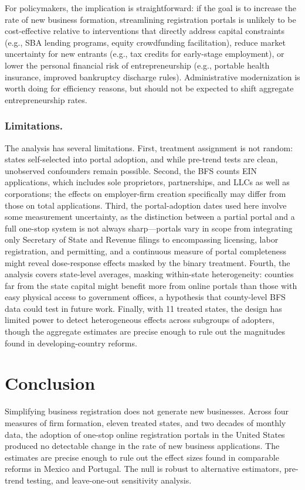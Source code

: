\documentclass[12pt]{article}
\begin{document}
For policymakers, the implication is straightforward: if the goal is to increase the rate of new business formation, streamlining registration portals is unlikely to be cost-effective relative to interventions that directly address capital constraints (e.g., SBA lending programs, equity crowdfunding facilitation), reduce market uncertainty for new entrants (e.g., tax credits for early-stage employment), or lower the personal financial risk of entrepreneurship (e.g., portable health insurance, improved bankruptcy discharge rules). Administrative modernization is worth doing for efficiency reasons, but should not be expected to shift aggregate entrepreneurship rates.

\subsubsection*{Limitations.}
The analysis has several limitations. First, treatment assignment is not random: states self-selected into portal adoption, and while pre-trend tests are clean, unobserved confounders remain possible. Second, the BFS counts EIN applications, which includes sole proprietors, partnerships, and LLCs as well as corporations; the effects on employer-firm creation specifically may differ from those on total applications. Third, the portal-adoption dates used here involve some measurement uncertainty, as the distinction between a partial portal and a full one-stop system is not always sharp---portals vary in scope from integrating only Secretary of State and Revenue filings to encompassing licensing, labor registration, and permitting, and a continuous measure of portal completeness might reveal dose-response effects masked by the binary treatment. Fourth, the analysis covers state-level averages, masking within-state heterogeneity: counties far from the state capital might benefit more from online portals than those with easy physical access to government offices, a hypothesis that county-level BFS data could test in future work. Finally, with 11 treated states, the design has limited power to detect heterogeneous effects across subgroups of adopters, though the aggregate estimates are precise enough to rule out the magnitudes found in developing-country reforms.

\section{Conclusion}

Simplifying business registration does not generate new businesses. Across four measures of firm formation, eleven treated states, and two decades of monthly data, the adoption of one-stop online registration portals in the United States produced no detectable change in the rate of new business applications. The estimates are precise enough to rule out the effect sizes found in comparable reforms in Mexico and Portugal. The null is robust to alternative estimators, pre-trend testing, and leave-one-out sensitivity analysis.
\end{document}
